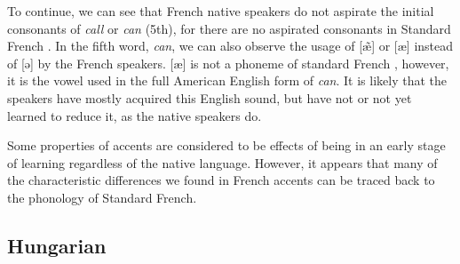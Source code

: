 \documentclass[output=paper]{LSP/langsci}
\begin{document}
To continue, we can see that French native speakers do not aspirate the initial consonants of \textit{call} or \textit{can} (5th), for there are no aspirated consonants in Standard French \citep[p. 35]{walker_pronunciation_1984}. In the fifth word, \textit{can}, we can also observe the usage of [æ̃] or [æ] instead of [ə] by the French speakers. [æ] is not a phoneme of standard French \citep{walker_french_2001}, however, it is the vowel used in the full American English form of \textit{can}. It is likely that the speakers have mostly acquired this English sound, but have not or not yet learned to reduce it, as the native speakers do.

Some properties of accents are considered to be effects of being in an early stage of learning regardless of the native language. However, it appears that many of the characteristic differences we found in French accents can be traced back to the phonology of Standard French.

\subsection{Hungarian}
\end{document}
